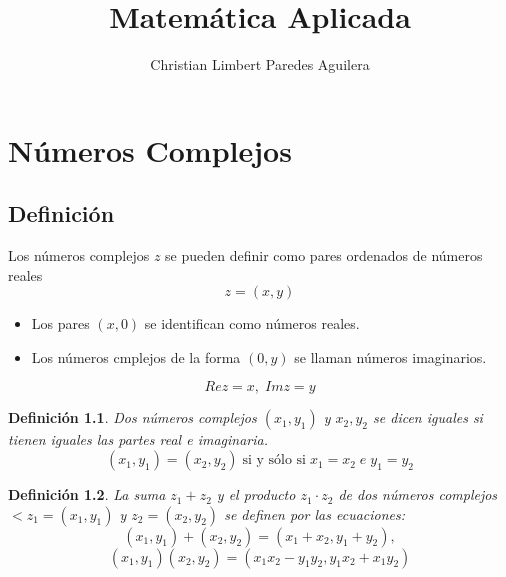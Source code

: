 \documentclass[10pt]{book}
\newtheorem{def.}{\textbf{Definición}}[chapter]%
\begin{document}
\normalfont

\author{\Large Christian Limbert Paredes Aguilera}
\title{Matemática Aplicada }
\date{}
\pagestyle{empty}
\maketitle
\thispagestyle{empty}
\let\cleardoublepage\clearpage
\tableofcontents								%


 
\let\cleardoublepage\clearpage

\chapter{Números Complejos}
\section{Definición}
\begin{tcolorbox}[colback = white]
Los números complejos $z$ se pueden definir como pares ordenados de números reales
\begin{equation}
z=(x,y)
\end{equation}
\begin{itemize}
\item Los pares $(x,0)$ se identifican como números reales.
\item Los números cmplejos de la forma $(0,y)$ se llaman números imaginarios.
\end{itemize}
\begin{equation}
Re z = x, \; Im z = y
\end{equation}
\end{tcolorbox}

\begin{tcolorbox}[colback = white]
\begin{def.}
Dos números complejos $(x_1,y_1)$ y $x_2,y_2$ se dicen iguales si tienen iguales las partes real e imaginaria.
\begin{equation}
(x_1,y_1) = (x_2,y_2) \; \mbox{si y sólo si} \; x_1=x_2 \; e \; y_1=y_2
\end{equation}
\end{def.}
\end{tcolorbox}

\begin{tcolorbox}[colback = white]
\begin{def.}
La suma $z_1+z_2$ y el producto $z_1 \cdot z_2$ de dos números complejos $<z_1 = (x_1,y_1)$ y $z_2 = (x_2,y_2)$ se definen por las ecuaciones:
\begin{equation}
(x_1,y_1) + (x_2,y_2) = (x_1+x_2, y_1+y_2),
\end{equation}
\begin{equation}
(x_1,y_1)(x_2,y_2) = (x_1 x_2 - y_1 y_2, y_1 x_2 + x_1 y_2)
\end{equation}
\end{def.}
\end{tcolorbox}
\end{document}
